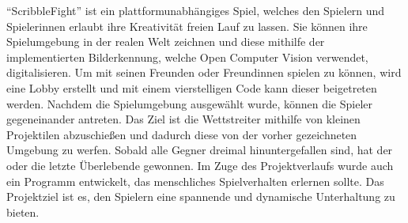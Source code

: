 ``ScribbleFight'' ist ein plattformunabhängiges Spiel, welches den Spielern und Spielerinnen erlaubt ihre Kreativität freien Lauf zu lassen.
Sie können ihre Spielumgebung in der realen Welt zeichnen und diese mithilfe der implementierten Bilderkennung, welche Open Computer Vision verwendet, digitalisieren.
Um mit seinen Freunden oder Freundinnen spielen zu können, wird eine Lobby erstellt und mit einem vierstelligen Code kann dieser beigetreten werden.
Nachdem die Spielumgebung ausgewählt wurde, können die Spieler gegeneinander antreten.
Das Ziel ist die Wettstreiter mithilfe von kleinen Projektilen abzuschießen und dadurch diese von der vorher gezeichneten Umgebung zu werfen.
Sobald alle Gegner dreimal hinuntergefallen sind, hat der oder die letzte Überlebende gewonnen.
Im Zuge des Projektverlaufs wurde auch ein Programm entwickelt, das menschliches Spielverhalten erlernen sollte.
Das Projektziel ist es, den Spielern eine spannende und dynamische Unterhaltung zu bieten.

